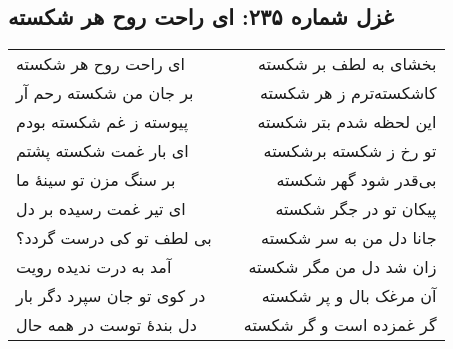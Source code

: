 \begin{center}
\section*{غزل شماره ۲۳۵: ای راحت روح هر شکسته}
\label{sec:235}
\begin{longtable}{l p{0.5cm} r}
ای راحت روح هر شکسته
&&
بخشای به لطف بر شکسته
\\
بر جان من شکسته رحم آر
&&
کاشکسته‌ترم ز هر شکسته
\\
پیوسته ز غم شکسته بودم
&&
این لحظه شدم بتر شکسته
\\
ای بار غمت شکسته پشتم
&&
تو رخ ز شکسته برشکسته
\\
بر سنگ مزن تو سینهٔ ما
&&
بی‌قدر شود گهر شکسته
\\
ای تیر غمت رسیده بر دل
&&
پیکان تو در جگر شکسته
\\
بی لطف تو کی درست گردد؟
&&
جانا دل من به سر شکسته
\\
آمد به درت ندیده رویت
&&
زان شد دل من مگر شکسته
\\
در کوی تو جان سپرد دگر بار
&&
آن مرغک بال و پر شکسته
\\
دل بندهٔ توست در همه حال
&&
گر غمزده است و گر شکسته
\\
\end{longtable}
\end{center}
